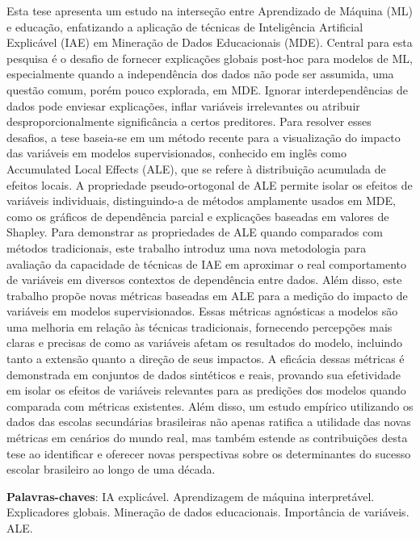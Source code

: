 
\begin{resumo}[Resumo] 
Esta tese apresenta um estudo na interseção entre Aprendizado de Máquina (ML) e educação, enfatizando a aplicação de técnicas de Inteligência Artificial Explicável (IAE) em Mineração de Dados Educacionais (MDE). Central para esta pesquisa é o desafio de fornecer explicações globais post-hoc para modelos de ML, especialmente quando a independência dos dados não pode ser assumida, uma questão comum, porém pouco explorada, em MDE. Ignorar interdependências de dados pode enviesar explicações, inflar variáveis irrelevantes ou atribuir desproporcionalmente significância a certos preditores. Para resolver esses desafios, a tese baseia-se em um método recente para a visualização do impacto das variáveis em modelos supervisionados, conhecido em inglês como Accumulated Local Effects (ALE), que se refere à distribuição acumulada de efeitos locais. A propriedade pseudo-ortogonal de ALE permite isolar os efeitos de variáveis individuais, distinguindo-a de métodos amplamente usados em MDE, como os gráficos de dependência parcial e explicações baseadas  em valores de Shapley. Para demonstrar as propriedades de ALE quando comparados com métodos tradicionais, este trabalho introduz uma nova metodologia para avaliação da capacidade de técnicas de IAE em aproximar o real comportamento de variáveis  em diversos contextos de dependência entre dados. Além disso, este trabalho propõe novas métricas baseadas em ALE para a medição do impacto de variáveis em modelos supervisionados. Essas métricas agnósticas a modelos são uma melhoria em relação às técnicas tradicionais, fornecendo percepções mais claras e precisas de como as variáveis afetam os resultados do modelo, incluindo tanto a extensão quanto a direção de seus impactos. A eficácia dessas métricas é demonstrada em conjuntos de dados sintéticos e reais, provando sua efetividade em isolar os efeitos de  variáveis relevantes para as predições dos modelos quando comparada com métricas existentes. Além disso, um estudo empírico utilizando os dados das escolas secundárias brasileiras não apenas ratifica a utilidade das novas métricas em cenários do mundo real, mas também estende as contribuições desta tese ao identificar e oferecer novas perspectivas sobre os determinantes do sucesso escolar brasileiro ao longo de uma década.


 \vspace{\onelineskip}
    
 \noindent
 \textbf{Palavras-chaves}: IA explicável. Aprendizagem de máquina interpretável.  Explicadores globais. Mineração de dados educacionais. Importância de variáveis. ALE.
\end{resumo}

